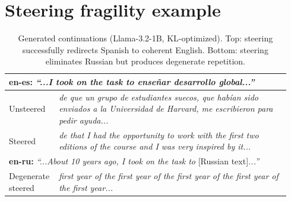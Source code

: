 \section{Steering fragility example}

\begin{table}[ht]
  \centering
  \small
  \begin{tabular}{p{0.14\linewidth} p{0.80\linewidth}}
    \hline
    \multicolumn{2}{l}{\textbf{en-es:} \textit{``...I took on the task to ense\~{n}ar desarrollo global...''}} \\
    \hline
    Unsteered & \textit{de que un grupo de estudiantes suecos, que hab\'{i}an sido enviados a la Universidad de Harvard, me escribieron para pedir ayuda...} \\
    Steered & \textit{de that I had the opportunity to work with the first two editions of the course and I was very inspired by it...} \\
    \hline
    \multicolumn{2}{l}{\textbf{en-ru:} \textit{``...About 10 years ago, I took on the task to} [Russian text]\textit{...''}} \\
    \hline
    Degenerate steered & \textit{first year of the first year of the first year of the first year of the first year...} \\
    \hline
  \end{tabular}
  \caption{Generated continuations (Llama-3.2-1B, KL-optimized). Top: steering successfully redirects Spanish to coherent English. Bottom: steering eliminates Russian but produces degenerate repetition.}
  \label{tab:qualitative}
\end{table}